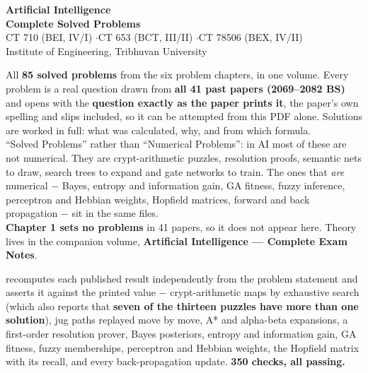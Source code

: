 \documentclass[10pt]{article}
\begin{document}
\thispagestyle{empty}
\vspace*{2.0cm}
\begin{center}
  {\Huge\bfseries\color{acc} Artificial Intelligence}\\[6pt]
  {\LARGE\bfseries Complete Solved Problems}\\[14pt]
  {\large\color{sub} CT 710 (BEI, IV/I) \quad$\cdot$\quad CT 653 (BCT, III/II)
   \quad$\cdot$\quad CT 78506 (BEX, IV/II)}\\[3pt]
  {\color{sub} Institute of Engineering, Tribhuvan University}\\[20pt]
  \begin{minipage}{0.78\textwidth}
    \color{sub}\small
    All \textbf{85 solved problems} from the six problem chapters, in one volume. Every
    problem is a real question drawn from \textbf{all 41 past papers (2069--2082 BS)} and
    opens with the \textbf{question exactly as the paper prints it}, the paper's own
    spelling and slips included, so it can be attempted from this PDF alone. Solutions
    are worked in full: what was calculated, why, and from which formula.\\[8pt]
    ``Solved Problems'' rather than ``Numerical Problems'': in AI most of these are not
    numerical. They are crypt-arithmetic puzzles, resolution proofs, semantic nets to
    draw, search trees to expand and gate networks to train. The ones that \emph{are}
    numerical $-$ Bayes, entropy and information gain, GA fitness, fuzzy inference,
    perceptron and Hebbian weights, Hopfield matrices, forward and back propagation $-$
    sit in the same files.\\[8pt]
    \textbf{Chapter 1 sets no problems} in 41 papers, so it does not appear here.
    Theory lives in the companion volume,
    \textbf{Artificial Intelligence --- Complete Exam Notes}.
  \end{minipage}
\end{center}

\vspace{10pt}


\par{}\vspace{12pt}
\begin{center}
\begin{minipage}{0.88\textwidth}\small\color{sub}
 recomputes each published result independently from the problem
statement and asserts it against the printed value $-$ crypt-arithmetic maps by
exhaustive search (which also reports that \textbf{seven of the thirteen puzzles have
more than one solution}), jug paths replayed move by move, A* and alpha-beta expansions,
a first-order resolution prover, Bayes posteriors, entropy and information gain, GA
fitness, fuzzy memberships, perceptron and Hebbian weights, the Hopfield matrix with its
recall, and every back-propagation update. \textbf{350 checks, all passing.}
\end{minipage}
\end{center}
\end{document}
